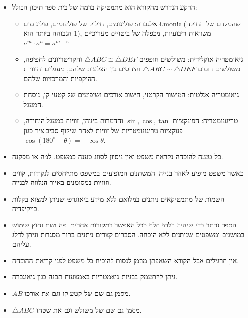 \begin{itemize}
\item
הרקע הנדרש מהקורא הוא מתמטיקה ברמה של בית ספר תיכון הכולל:

\begin{itemize}
\item
אלגברה: פולינומים, חילוק של פולינומים, פולינומים 
\L{monic}
(שהמקדם של החזקה הגבוהה ביותר הוא $1$), משוואות ריבועיות, מכפלה של ביטויים מעריכיים 
$a^m\cdot a^n=a^{m+n}$.

\item
גיאומטריה אוקלידית: משולשים חופפים 
$\triangle ABC \cong \triangle DEF$
והקריטריונים לחפיפה, משולשים דומים
$\triangle ABC \sim \triangle DEF$
והיחסים בין הצלעות שלהם, מעגלים והזוויות ההיקפיות והמרכזיות שלהם.

\item
גיאומטריה אנלטית: המישור הקרטזי, חישוב אורכים ושיפועים של קטעי קו, נוסחת המעגל.

\item
טריגונומטריה: הפונקציות 
$\sin,\cos,\tan$
וההמרות ביניהן, זוויות במעגל היחידה, פנוקציות טריגונומטריות של זוויות לאחר שיקוף סביב ציר כגון
$\cos (180^\circ-\theta)=-\cos\theta$.
\end{itemize}

\item
כל טענה להוכחה נקראת 
\emph{משפט}
ואין ניסיון לסווג טענה כמשפט, למה או מסקנה.

\item
כאשר משפט מופיע לאחר בנייה, המשתנים המופיעים במשפט מתייחסים לנקודות, קווים וזוויות במסומנים באיור הנלווה לבנייה.

\item
השמות של מתמטיקאים ניתנים במלואם ללא מידע ביאוגרפי שניתן למצוא בקלות בויקיפדיה.

\item
הספר נכתב כדי שיהיה בלתי תלוי ככל האפשר במקורות אחרים. פה ושם נחוץ שימוש במושגים ומשפטים שניתנים ללא הוכחה. הסברים קצרים ניתנים בתוך מסגרות וניתן לדלג עליהם.

\item
אין תרגילים אבל הקורא השאפתן מוזמן לנסות להוכיח כל משפט לפני קריאת ההוכחה.

\item
ניתן להתעמק בבניות גיאמטריות באמצעות תכנה כגון גיאוגברה.

\item
$\overline{AB}$
מסמן גם שם של קטע קו וגם את אורכו.

\item
$\triangle ABC$
מסמן גם שם של משולש וגם את שטחו.
\end{itemize}

